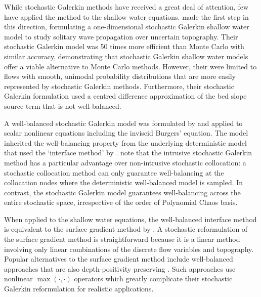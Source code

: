 While stochastic Galerkin methods have received a great deal of attention, few have applied the method to the shallow water equations.
\citet{ge2008} made the first step in this direction, formulating a one-dimensional stochastic Galerkin shallow water model to study solitary wave propagation over uncertain topography.
Their stochastic Galerkin model was 50 times more efficient than Monte Carlo with similar accuracy, demonstrating that stochastic Galerkin shallow water models offer a viable alternative to Monte Carlo methods.
However, their  were limited to flows with smooth, unimodal probability distributions that are more easily represented by stochastic Galerkin methods.
Furthermore, their stochastic Galerkin formulation used a centred difference approximation of the bed slope source term that is not well-balanced.

A well-balanced stochastic Galerkin model was formulated by \citet{jin2016} and applied to scalar nonlinear equations including the inviscid Burgers' equation.
The model inherited the well-balancing property from the underlying deterministic model that used the `interface method' by \citet{jin2001}.
\citet{jin2016} note that the intrusive stochastic Galerkin method has a particular advantage over non-intrusive stochastic collocation:
a stochastic collocation method can only guarantee well-balancing at the collocation nodes where the deterministic well-balanced model is sampled.
In contrast, the stochastic Galerkin model guarantees well-balancing across the entire stochastic space, irrespective of the order of Polynomial Chaos basis.

When applied to the shallow water equations, the well-balanced interface method is equivalent to the surface gradient method by \citet{zhou2001}.
A stochastic reformulation of the surface gradient method is straightforward because it is a linear method involving only linear combinations of the discrete flow variables and topography.
Popular alternatives to the surface gradient method include well-balanced approaches that are also depth-positivity preserving \citep{audusse2004,liang-marche2009}.
Such approaches use nonlinear $\max(\cdot, \cdot)$ operators which greatly complicate their stochastic Galerkin reformulation for realistic applications.

